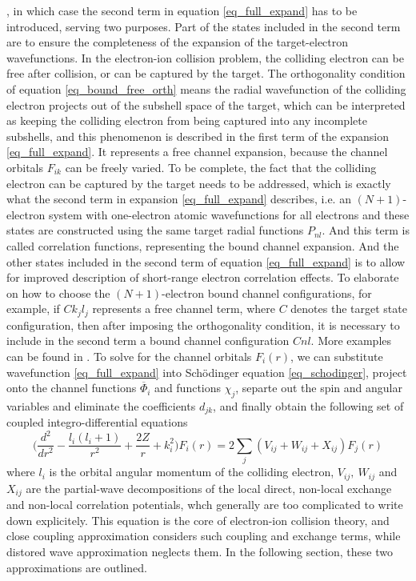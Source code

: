 , in which case the second term in equation \ref{eq_full_expand} has to be introduced, serving two purposes. Part of the states included in the second term are to ensure the completeness of the expansion of the target-electron wavefunctions. In the electron-ion collision problem, the colliding electron can be free after collision, or can be captured by the target. The orthogonality condition of equation \ref{eq_bound_free_orth} means the radial wavefunction of the colliding electron projects out of the subshell space of the target, which can be interpreted as keeping the colliding electron from being captured into any incomplete subshells, and this phenomenon is described in the first term of the expansion \ref{eq_full_expand}. It represents a free channel expansion, because the channel orbitals $F_{ik}$ can be freely varied. To be complete, the fact that the colliding electron can be captured by the target needs to be addressed, which is exactly what the second term in expansion \ref{eq_full_expand} describes, i.e. an $(N+1)$-electron system with one-electron atomic wavefunctions for all electrons and these states are constructed using the same target radial functions $P_{nl}$. And this term is called correlation functions, representing the bound channel expansion. And the other states included in the second term of equation \ref{eq_full_expand} is to allow for improved description of short-range electron correlation effects. To elaborate on how to choose the $(N+1)$-electron bound channel configurations, for example, if $Ck_jl_j$ represents a free channel term, where $C$ denotes the target state configuration, then after imposing the orthogonality condition, it is necessary to include in the second term a bound channel configuration $Cnl$. More examples can be found in \citet{dw_review_1, henry_1993}. To solve for the channel orbitals $F_i(r)$, we can substitute wavefunction \ref{eq_full_expand} into Sch\"odinger equation \ref{eq_schodinger}, project onto the channel functions $\overline\Phi_i$ and functions $\chi_j$, separte out the spin and angular variables and eliminate the coefficients $d_{jk}$, and finally obtain the following set of coupled integro-differential equations \citep{bspline_2006}
\begin{equation} \label{eq_coupled_intdiff}
	\Bigg(\frac{d^2}{dr^2} - \frac{l_i(l_i+1)}{r^2} + \frac{2Z}{r} + k_i^2\Bigg) F_i(r) = 2 \sum_j(V_{ij}+W_{ij}+X_{ij})F_j(r)
\end{equation}
where $l_i$ is the orbital angular momentum of the colliding electron, $V_{ij},~W_{ij}$ and $X_{ij}$ are the partial-wave decompositions of the local direct, non-local exchange and non-local correlation potentials, whch generally are too complicated to write down explicitely. This equation is the core of electron-ion collision theory, and close coupling approximation considers such coupling and exchange terms, while distored wave approximation neglects them. In the following section, these two approximations are outlined.

